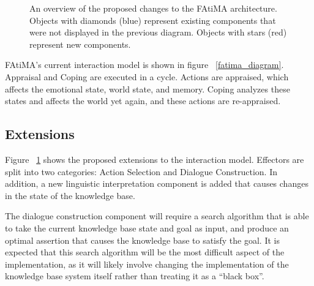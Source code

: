 \documentclass{article}
\begin{document}
\begin{figure}[htbp!]
  \caption{An overview of the proposed changes to the FAtiMA architecture.  Objects with diamonds (blue)
  represent existing components that were not displayed in the previous diagram.  Objects with stars (red)
  represent new components.}
  \label{fatima_diagram_modifications}
\end{figure}

FAtiMA's current interaction model is shown in figure ~\ref{fatima_diagram}.
Appraisal and Coping are executed in a cycle.  Actions are appraised, which
affects the emotional state, world state, and memory.  Coping analyzes these
states and affects the world yet again, and these actions are re-appraised.

\subsection{Extensions}

Figure ~\ref{fatima_diagram_modifications} shows the proposed extensions
to the interaction model.  Effectors are split into two categories: Action
Selection and Dialogue Construction.  In addition, a new linguistic interpretation
component is added that causes changes in the state of the knowledge base.

The dialogue construction component will require a search algorithm that is
able to take the current knowledge base state and goal as input, and produce
an optimal assertion that causes the knowledge base to satisfy the goal.  It
is expected that this search algorithm will be the most difficult aspect
of the implementation, as it will likely involve changing the implementation
of the knowledge base system itself rather than treating it as a ``black box''.
\end{document}
